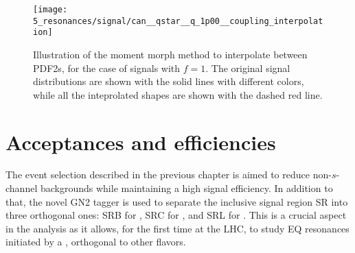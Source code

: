 \begin{figure}[ht!]
    \centering
    \texttt{[image: 5\_resonances/signal/can\_\_qstar\_\_q\_1p00\_\_coupling\_interpolation]}
    \caption{Illustration of the moment morph method to interpolate between \acp{PDF2}, for the case of \qstar signals with \(f=1\). The original signal distributions are shown with the solid lines with different colors, while all the inteprolated shapes are shown with the dashed red line.}
    \label{fig:signals:modeling:final_interpolation}
\end{figure}










\section{Acceptances and efficiencies}
\label{sec:signals:acc_eff}

The event selection described in the previous chapter is aimed to reduce non-\(s\)-channel \gammajet backgrounds while maintaining a high signal efficiency. In addition to that, the novel GN2 tagger is used to separate the inclusive signal region SR into three orthogonal ones: SRB for \bjets, SRC for \cjets, and SRL for \ljets. This is a crucial aspect in the analysis as it allows, for the first time at the \ac{LHC}, to study \ac{EQ} resonances initiated by a \cstar, orthogonal to other flavors.

